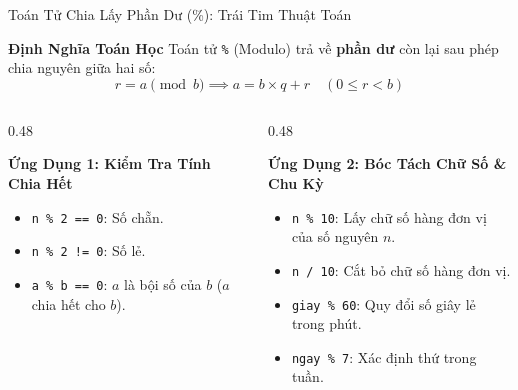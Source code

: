 \documentclass[aspectratio=169, 10pt]{beamer}
\begin{document}
\begin{frame}[fragile]{Toán Tử Chia Lấy Phần Dư (\%): Trái Tim Thuật Toán}
  \begin{block}{\textbf{Định Nghĩa Toán Học}}
    Toán tử \texttt{\%} (Modulo) trả về \textbf{phần dư} còn lại sau phép chia nguyên giữa hai số:
    \[ r = a \pmod b \implies a = b \times q + r \quad (0 \le r < b) \]
  \end{block}
  \begin{columns}[T]
    \begin{column}{0.48\textwidth}
      \begin{exampleblock}{\textbf{Ứng Dụng 1: Kiểm Tra Tính Chia Hết}}
        \begin{itemize}
          \item \texttt{n \% 2 == 0}: Số chẵn.
          \item \texttt{n \% 2 != 0}: Số lẻ.
          \item \texttt{a \% b == 0}: $a$ là bội số của $b$ ($a$ chia hết cho $b$).
        \end{itemize}
      \end{exampleblock}
    \end{column}
    \begin{column}{0.48\textwidth}
      \begin{exampleblock}{\textbf{Ứng Dụng 2: Bóc Tách Chữ Số \& Chu Kỳ}}
        \begin{itemize}
          \item \texttt{n \% 10}: Lấy chữ số hàng đơn vị của số nguyên $n$.
          \item \texttt{n / 10}: Cắt bỏ chữ số hàng đơn vị.
          \item \texttt{giay \% 60}: Quy đổi số giây lẻ trong phút.
          \item \texttt{ngay \% 7}: Xác định thứ trong tuần.
        \end{itemize}
      \end{exampleblock}
    \end{column}
  \end{columns}
\end{frame}
\end{document}
